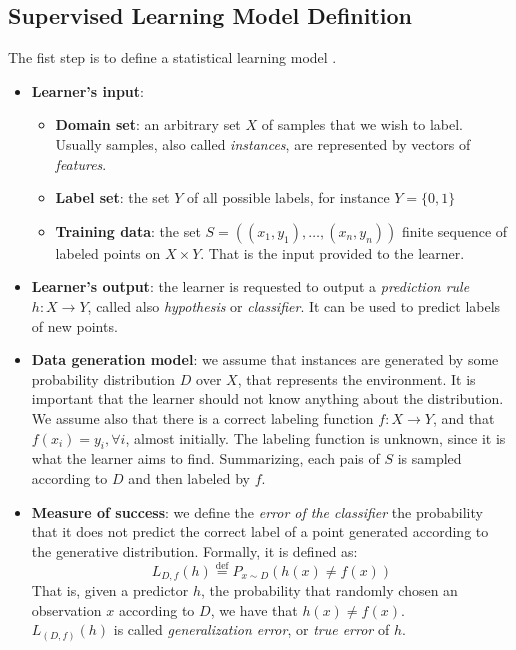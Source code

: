 \subsection{Supervised Learning Model Definition}
The fist step is to define a statistical learning model \cite{Shalev-Shwartz:2014:UML:2621980}.
\begin{itemize}
	\item \textbf{Learner's input}: 
	\begin{itemize}
		\item \textbf{Domain set}: an arbitrary set $X$ of samples that we wish to label. Usually samples, also called \textit{instances}, are represented by vectors of \textit{features}.
		\item \textbf{Label set}: the set $Y$ of all possible labels, for instance $Y=\{0,1\}$
		\item \textbf{Training data}: the set $S=((x_1,y_1), \dots, (x_n,y_n))$ finite sequence of labeled points on $X \times Y$. That is the input provided to the learner.
	\end{itemize}

	\item \textbf{Learner's output}: the learner is requested to output a \textit{prediction rule} $h: X \rightarrow Y$, called also \textit{hypothesis} or \textit{classifier}. It can be used to predict labels of new points.
	
	\item \textbf{Data generation model}: we assume that instances are generated by some probability distribution $D$ over $X$, that represents the environment. It is important that the learner should not know anything about the distribution. We assume also that there is a correct labeling function $f: X \rightarrow Y$, and that $f(x_i) = y_i, \forall i$, almost initially. The labeling function is unknown, since it is what the learner aims to find. Summarizing, each pais of $S$ is sampled according to $D$ and then labeled by $f$.
	
	\item  \textbf{Measure of success}: we define the \textit{error of the classifier} the probability that it does not predict the correct label of a point generated according to the generative distribution. Formally, it is defined as:
	\[L_{D,f}(h) \stackrel{\text{def}}{=} P_{x \sim D}(h(x) \neq f(x)) \]
	That is, given a predictor $h$, the probability that randomly chosen an observation $x$ according to $D$, we have that $h(x) \neq f(x)$.\\
	$L_{(D,f)}(h)$ is called \textit{generalization error}, or \textit{true error} of $h$.
	
\end{itemize}


